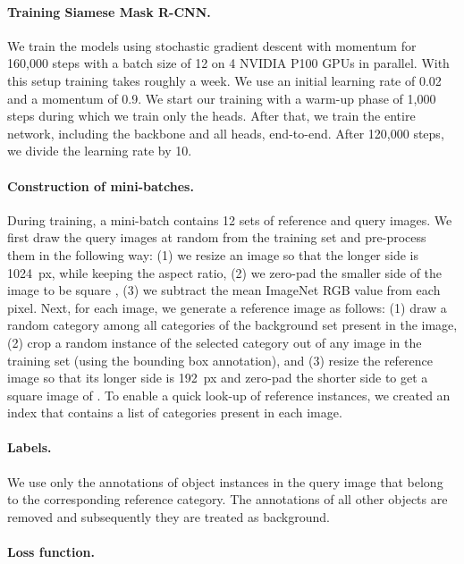 \documentclass{article}
\begin{document}
\paragraph{Training Siamese Mask R-CNN.}
We train the models using stochastic gradient descent with momentum for 160,000 steps with a batch size of 12 on 4 NVIDIA P100 GPUs in parallel. With this setup training takes roughly a week. We use an initial learning rate of 0.02 and a momentum of 0.9. We start our training with a warm-up phase of 1,000 steps during which we train only the heads. After that, we train the entire network, including the backbone and all heads, end-to-end. After 120,000 steps, we divide the learning rate by 10.


\paragraph{Construction of mini-batches.}
During training, a mini-batch contains 12 sets of reference and query images. We first draw the query images at random from the training set and pre-process them in the following way: (1) we resize an image so that the longer side is 1024~px, while keeping the aspect ratio, (2) we zero-pad the smaller side of the image to be square , (3) we subtract the mean ImageNet RGB value from each pixel. Next, for each image, we generate a reference image as follows: (1) draw a random category among all categories of the background set present in the image, (2) crop a random instance of the selected category out of any image in the training set (using the bounding box annotation), and (3) resize the reference image so that its longer side is 192~px and zero-pad the shorter side to get a square image of . To enable a quick look-up of reference instances, we created an index that contains a list of categories present in each image.


\paragraph{Labels.}
We use only the annotations of object instances in the query image that belong to the corresponding reference category. The annotations of all other objects are removed and subsequently they are treated as background.


\paragraph{Loss function.}
\end{document}
